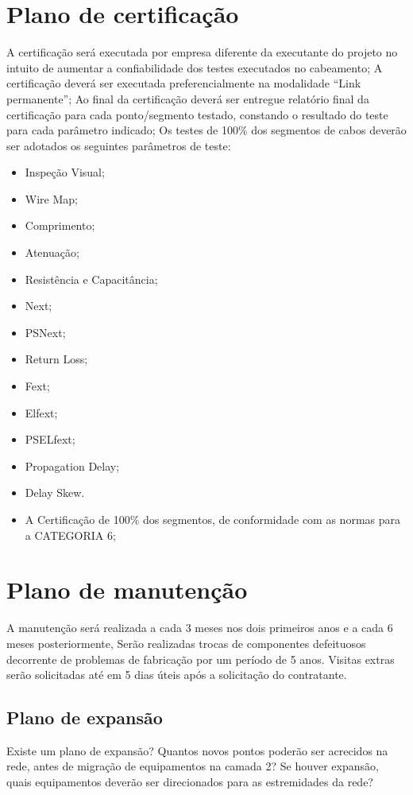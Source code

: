 \documentclass[	DIV=calc,%
							paper=a4,%
							fontsize=12pt,%
							onecolumn]{scrartcl}	 					%
\begin{document}
\section{Plano de certificação}
A certificação será executada por empresa diferente da executante do projeto no intuito de aumentar a confiabilidade dos testes executados no cabeamento;\newline
A certificação deverá ser executada preferencialmente na modalidade “Link permanente”;\newline
Ao final da certificação deverá ser entregue relatório final da certificação para cada ponto/segmento testado, constando o resultado do teste para cada parâmetro indicado;\newline
Os testes de 100\% dos segmentos de cabos deverão ser adotados os seguintes parâmetros de teste:\newline
\begin{itemize}
	\item Inspeção Visual; 
	\item Wire Map; 
	\item Comprimento; 
	\item Atenuação; 
	\item Resistência e Capacitância; 
	\item Next;
	\item PSNext; 
	\item Return Loss; 
	\item Fext; 
	\item Elfext; 
	\item PSELfext; 
	\item Propagation Delay; 
	\item Delay Skew. 
	\item  A Certificação de 100\% dos segmentos, de conformidade com as normas para a CATEGORIA 6;
\end{itemize}
\section{Plano de manutenção}

A manutenção será realizada a cada 3 meses nos dois primeiros anos e a cada 6 meses posteriormente, Serão realizadas trocas de componentes defeituosos decorrente de problemas de fabricação por um período de 5 anos. Visitas extras serão solicitadas até em 5 dias úteis após a solicitação do contratante.

\subsection{Plano de expansão}
Existe um plano de expansão? Quantos novos pontos poderão ser acrecidos na rede, antes de migração de equipamentos na camada 2? Se houver expansão, quais equipamentos deverão ser direcionados para as estremidades da rede? 
\end{document}
